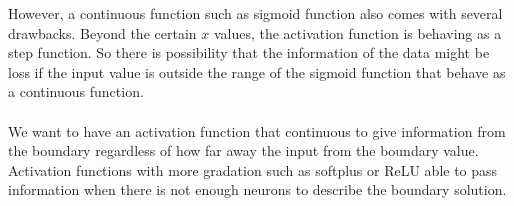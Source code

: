 \hfill\break
However, a continuous function such as sigmoid function also comes with several drawbacks. Beyond the certain $x$ values, the activation function is behaving as a step function. So there is possibility that the information of the data might be loss if the input value is outside the range of the sigmoid function that behave as a continuous function. 
\\\\
We want to have an activation function that continuous to give information from the boundary regardless of how far away the input from the boundary value. Activation functions with more gradation such as softplus or ReLU able to pass information when there is not enough neurons to describe the boundary solution. 

\begin{figure}[H]
	\centering
\end{figure}

\begin{figure}[H]
	\centering
\end{figure}

